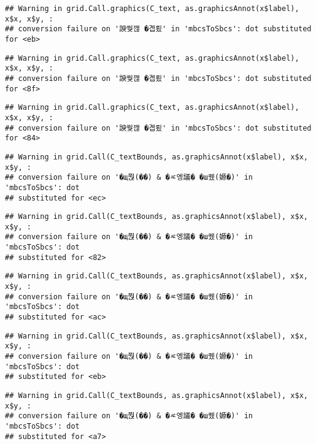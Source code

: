\documentclass[
]{article}
\begin{document}
\begin{verbatim}
## Warning in grid.Call.graphics(C_text, as.graphicsAnnot(x$label), x$x, x$y, :
## conversion failure on '諛쒖깮 �곕룄' in 'mbcsToSbcs': dot substituted for <eb>
\end{verbatim}

\begin{verbatim}
## Warning in grid.Call.graphics(C_text, as.graphicsAnnot(x$label), x$x, x$y, :
## conversion failure on '諛쒖깮 �곕룄' in 'mbcsToSbcs': dot substituted for <8f>
\end{verbatim}

\begin{verbatim}
## Warning in grid.Call.graphics(C_text, as.graphicsAnnot(x$label), x$x, x$y, :
## conversion failure on '諛쒖깮 �곕룄' in 'mbcsToSbcs': dot substituted for <84>
\end{verbatim}

\begin{verbatim}
## Warning in grid.Call(C_textBounds, as.graphicsAnnot(x$label), x$x, x$y, :
## conversion failure on '�щ쭩(��) & �ㅼ엥議� �ш퀬(嫄�)' in 'mbcsToSbcs': dot
## substituted for <ec>
\end{verbatim}

\begin{verbatim}
## Warning in grid.Call(C_textBounds, as.graphicsAnnot(x$label), x$x, x$y, :
## conversion failure on '�щ쭩(��) & �ㅼ엥議� �ш퀬(嫄�)' in 'mbcsToSbcs': dot
## substituted for <82>
\end{verbatim}

\begin{verbatim}
## Warning in grid.Call(C_textBounds, as.graphicsAnnot(x$label), x$x, x$y, :
## conversion failure on '�щ쭩(��) & �ㅼ엥議� �ш퀬(嫄�)' in 'mbcsToSbcs': dot
## substituted for <ac>
\end{verbatim}

\begin{verbatim}
## Warning in grid.Call(C_textBounds, as.graphicsAnnot(x$label), x$x, x$y, :
## conversion failure on '�щ쭩(��) & �ㅼ엥議� �ш퀬(嫄�)' in 'mbcsToSbcs': dot
## substituted for <eb>
\end{verbatim}

\begin{verbatim}
## Warning in grid.Call(C_textBounds, as.graphicsAnnot(x$label), x$x, x$y, :
## conversion failure on '�щ쭩(��) & �ㅼ엥議� �ш퀬(嫄�)' in 'mbcsToSbcs': dot
## substituted for <a7>
\end{verbatim}
\end{document}
